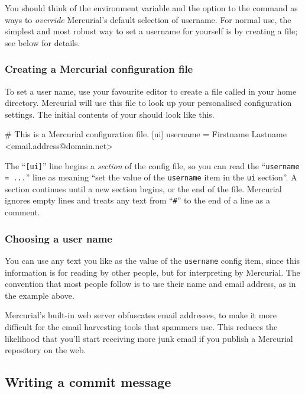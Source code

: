 You should think of the  environment variable and the
 option to the  command as ways to
\emph{override} Mercurial's default selection of username.  For normal
use, the simplest and most robust way to set a username for yourself
is by creating a  file; see below for details.

\subsubsection{Creating a Mercurial configuration file}
\label{sec:tour-basic:username}

To set a user name, use your favourite editor to create a file called
 in your home directory.  Mercurial will use this
file to look up your personalised configuration settings.  The initial
contents of your  should look like this.
\begin{codesample2}
  # This is a Mercurial configuration file.
  [ui]
  username = Firstname Lastname <email.address@domain.net>
\end{codesample2}
The ``\texttt{[ui]}'' line begins a \emph{section} of the config file,
so you can read the ``\texttt{username = ...}'' line as meaning ``set
the value of the \texttt{username} item in the \texttt{ui} section''.
A section continues until a new section begins, or the end of the
file.  Mercurial ignores empty lines and treats any text from
``\texttt{\#}'' to the end of a line as a comment.

\subsubsection{Choosing a user name}

You can use any text you like as the value of the \texttt{username}
config item, since this information is for reading by other people,
but for interpreting by Mercurial.  The convention that most people
follow is to use their name and email address, as in the example
above.

\begin{note}
  Mercurial's built-in web server obfuscates email addresses, to make
  it more difficult for the email harvesting tools that spammers use.
  This reduces the likelihood that you'll start receiving more junk
  email if you publish a Mercurial repository on the web.
\end{note}

\subsection{Writing a commit message}

